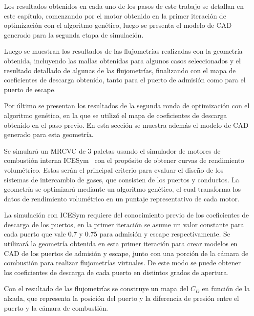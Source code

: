Los resultados obtenidos en cada uno de los pasos de este trabajo se detallan
en este capítulo, comenzando por el motor obtenido en la primer iteración de
optimización con el algoritmo genético, luego se presenta el modelo de CAD
generado para la segunda etapa de simulación.

Luego se muestran los resultados de las flujometrías realizadas con la
geometría obtenida, incluyendo las mallas obtenidas para algunos casos
seleccionados y el resultado detallado de algunas de las flujometrías,
finalizando con el mapa de coeficientes de descarga obtenido, tanto para el
puerto de admisión como para el puerto de escape.

Por último se presentan los resultados de la segunda ronda de optimización con
el algoritmo genético, en la que se utilizó el mapa de coeficientes de descarga
obtenido en el paso previo.
%
En esta sección se muestra además el modelo de CAD generado para esta
geometría.

%
%
Se simulará un MRCVC de 3 paletas usando el simulador de motores de combustión
interna ICESym~\parencite{icesym} con el propósito de obtener curvas de
rendimiento volumétrico.
%
Estas serán el principal criterio para evaluar el diseño de los sistemas de
intercambio de gases, que consisten de los puertos y conductos.
%
La geometría se optimizará mediante un algoritmo genético, el cual transforma
los datos de rendimiento volumétrico en un puntaje representativo de cada
motor.


La simulación con ICESym requiere del conocimiento previo de los coeficientes
de descarga de los puertos, en la primer iteración se asume un valor constante
para cada puerto que vale 0.7 y 0.75 para admisión y escape respectivamente.
%
Se utilizará la geometría obtenida en esta primer iteración para crear modelos
en CAD de los puertos de admisión y escape, junto con una porción de la cámara
de combustión para realizar flujometrías virtuales.
%
De este modo se puede obtener los coeficientes de descarga de cada puerto en
distintos grados de apertura.

Con el resultado de las flujometrías se construye un mapa del $C_D$ en función
de la alzada, que representa la posición del puerto y la diferencia de presión
entre el puerto y la cámara de combustión.


